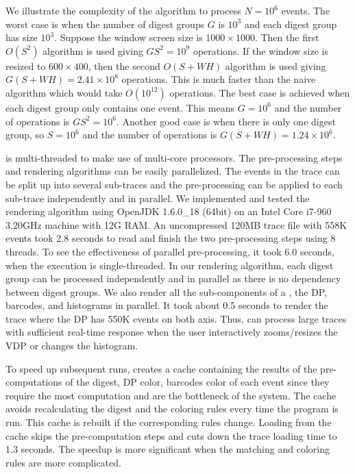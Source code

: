 We illustrate the complexity of the algorithm to process $N=10^6$ events.
The worst case is when the number of digest groups $G$ is $10^3$
and each digest group has size $10^3$.
Suppose the window screen size is $1000\times 1000$.
Then the first $O(S^2)$ algorithm is used giving $GS^2 = 10^9$ operations.
If the window size is resized to $600\times 400$, then
the second $O(S+W H)$ algorithm is used giving $G(S+WH)=2.41\times 10^8$ operations.
This is much faster than the naive algorithm which would take $O(10^{12})$
operations.
The best case is achieved when each digest group only contains one event.
This means $G = 10^6$ and the number of operations
is $G S^2=10^6$.
Another good case is when there is only one digest group,
so $S=10^6$ and the number of operations is $G(S + WH)=1.24\times10^6$.

\lviz{} is multi-threaded to make use of multi-core processors.
The pre-processing steps and rendering algorithms can be easily parallelized.
The events in the trace can be split up into several sub-traces and 
the pre-processing can be applied to each sub-trace
independently and in parallel.
We implemented and tested the rendering algorithm using
OpenJDK 1.6.0\_18 (64bit) on an Intel Core i7-960 3.20GHz
machine with 12G RAM.
An uncompressed 120MB trace file with 558K events took 2.8 seconds
to read and finish the two pre-processing steps using 8 threads.
To see the effectiveness of parallel pre-processing, it took 6.0 seconds,
when the execution is single-threaded.
In our rendering algorithm, each digest group can be processed
independently and in parallel as there is no dependency between digest groups.
We also render all the sub-components
of a \VDP, the DP, barcodes, and histograms in parallel.
It took about 0.5 seconds to render the trace where the DP has 550K events
on both axis.
Thus, \lviz{} can process large traces with sufficient real-time response
when the user interactively zooms/resizes the VDP or changes the histogram.

To speed up subsequent runs, \lviz{} creates a cache containing the results
of the pre-computations of the digest, DP color, barcodes color
of each event since they require the most computation
and are the bottleneck of the system. The cache avoids recalculating the
digest and the coloring rules every time the program is run.
This cache is rebuilt if the corresponding rules change.
Loading from the cache skips the pre-computation steps and
cuts down the trace loading time to 1.3 seconds.
The speedup is more significant when the matching and coloring rules are
more complicated.

